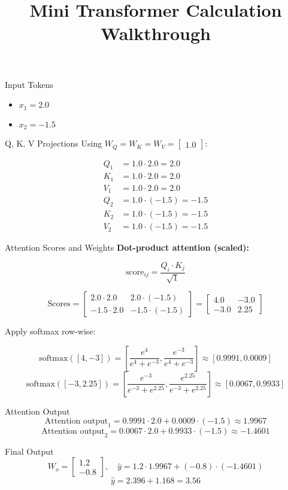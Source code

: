 \documentclass{beamer}
\title{Mini Transformer Calculation Walkthrough}
\author{}
\date{}
\begin{document}
\frame{\titlepage}

\begin{frame}{Input Tokens}
\begin{itemize}
  \item $x_1 = 2.0$
  \item $x_2 = -1.5$
\end{itemize}
\end{frame}

\begin{frame}{Q, K, V Projections}
Using $W_Q = W_K = W_V = \begin{bmatrix} 1.0 \end{bmatrix}$:

\begin{align*}
Q_1 &= 1.0 \cdot 2.0 = 2.0 \\
K_1 &= 1.0 \cdot 2.0 = 2.0 \\
V_1 &= 1.0 \cdot 2.0 = 2.0 \\[8pt]

Q_2 &= 1.0 \cdot (-1.5) = -1.5 \\
K_2 &= 1.0 \cdot (-1.5) = -1.5 \\
V_2 &= 1.0 \cdot (-1.5) = -1.5
\end{align*}
\end{frame}

\begin{frame}{Attention Scores and Weights}
\textbf{Dot-product attention (scaled):}

\[
\text{score}_{ij} = \frac{Q_i \cdot K_j}{\sqrt{1}}
\]

\[
\text{Scores} =
\begin{bmatrix}
2.0 \cdot 2.0 & 2.0 \cdot (-1.5) \\
-1.5 \cdot 2.0 & -1.5 \cdot (-1.5)
\end{bmatrix}
=
\begin{bmatrix}
4.0 & -3.0 \\
-3.0 & 2.25
\end{bmatrix}
\]

Apply softmax row-wise:

\[
\text{softmax}([4, -3]) = \left[\frac{e^4}{e^4 + e^{-3}}, \frac{e^{-3}}{e^4 + e^{-3}}\right] \approx [0.9991, 0.0009]
\]
\[
\text{softmax}([-3, 2.25]) = \left[\frac{e^{-3}}{e^{-3} + e^{2.25}}, \frac{e^{2.25}}{e^{-3} + e^{2.25}}\right] \approx [0.0067, 0.9933]
\]
\end{frame}

\begin{frame}{Attention Output}
\[
\text{Attention output}_1 = 0.9991 \cdot 2.0 + 0.0009 \cdot (-1.5) \approx 1.9967
\]
\[
\text{Attention output}_2 = 0.0067 \cdot 2.0 + 0.9933 \cdot (-1.5) \approx -1.4601
\]
\end{frame}

\begin{frame}{Final Output}
\[
W_o =
\begin{bmatrix}
1.2 \\
-0.8
\end{bmatrix}, \quad
\hat{y} = 1.2 \cdot 1.9967 + (-0.8) \cdot (-1.4601)
\]
\[
\hat{y} = 2.396 + 1.168 = \boxed{3.56}
\]
\end{frame}
\end{document}
